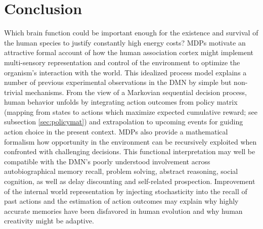 \documentclass[10pt,letterpaper]{article}
\def\W{\mathbf{W}}
\begin{document}


\section{Conclusion}
Which brain function could be important enough
for the existence and survival of the human species
to justify constantly high energy costs?
MDPs motivate an attractive
formal account of how the human association cortex
might implement multi-sensory representation and control of the environment to
optimize the organism's interaction with the world.
This idealized process model explains
a number of previous experimental observations in the
DMN by simple but non-trivial mechanisms.
%
From the view of a Markovian sequential decision process,
human behavior unfolds by integrating action outcomes from policy matrix (mapping from states to actions which maximize expected cumulative reward; see subsection \ref{sec:policymat})
and extrapolation to
upcoming events for guiding action choice in the present context.
MDPs also provide a mathematical formalism how
opportunity in the environment can be recursively exploited
when confronted with challenging decisions.
%
This functional interpretation may well be compatible with the DMN's
poorly understood involvement across
autobiographical memory recall, problem solving,
abstract reasoning, social cognition,
as well as delay discounting and self-related prospection.
Improvement of the internal world representation
by injecting stochasticity into the recall of past
actions and the estimation of action outcomes may explain why
highly accurate memories have been disfavored in human evolution
and why human creativity might be adaptive.
\end{document}
